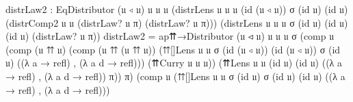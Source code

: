 \documentclass[
  11pt,
  oneside,
  article]{memoir}
\newenvironment{Shaded}{}{}
\newcommand{\NormalTok}[1]{#1}
\newcommand{\OtherTok}[1]{\textcolor[rgb]{0.00,0.44,0.13}{#1}}
\theoremstyle{definition}
\theoremstyle{plain}
\newcommand{\0}{\textsf{0}}
\newcommand{\1}{\tn{\textsf{1}}}
\begin{document}
\begin{Shaded}
\begin{Highlighting}[]
\NormalTok{    distrLaw2 }\OtherTok{:}\NormalTok{ EqDistributor }\OtherTok{(}\NormalTok{𝔲 ◃ 𝔲}\OtherTok{)}\NormalTok{ 𝔲 𝔲 𝔲}
                    \OtherTok{(}\NormalTok{distrLens 𝔲 𝔲 𝔲 }\OtherTok{(}\NormalTok{id }\OtherTok{(}\NormalTok{𝔲 ◃ 𝔲}\OtherTok{))}\NormalTok{ σ }\OtherTok{(}\NormalTok{id 𝔲}\OtherTok{)} \OtherTok{(}\NormalTok{id 𝔲}\OtherTok{)} 
                               \OtherTok{(}\NormalTok{distrComp2 𝔲 𝔲 }\OtherTok{(}\NormalTok{distrLaw? 𝔲 π}\OtherTok{)} 
                                               \OtherTok{(}\NormalTok{distrLaw? 𝔲 π}\OtherTok{)))} 
                    \OtherTok{(}\NormalTok{distrLens 𝔲 𝔲 𝔲 σ }\OtherTok{(}\NormalTok{id 𝔲}\OtherTok{)} \OtherTok{(}\NormalTok{id 𝔲}\OtherTok{)} \OtherTok{(}\NormalTok{id 𝔲}\OtherTok{)} 
                               \OtherTok{(}\NormalTok{distrLaw? 𝔲 π}\OtherTok{))}
\NormalTok{    distrLaw2 }\OtherTok{=} 
\NormalTok{        ap⇈→Distributor }\OtherTok{(}\NormalTok{𝔲 ◃ 𝔲}\OtherTok{)}\NormalTok{ 𝔲 𝔲 𝔲 σ}
            \OtherTok{(}\NormalTok{comp 𝔲 }
                \OtherTok{(}\NormalTok{comp }\OtherTok{(}\NormalTok{𝔲 ⇈ 𝔲}\OtherTok{)} 
                    \OtherTok{(}\NormalTok{comp }\OtherTok{(}\NormalTok{𝔲 ⇈ }\OtherTok{(}\NormalTok{𝔲 ⇈ 𝔲}\OtherTok{))} 
                        \OtherTok{(}\NormalTok{⇈[]Lens 𝔲 𝔲 σ }\OtherTok{(}\NormalTok{id }\OtherTok{(}\NormalTok{𝔲 ◃ 𝔲}\OtherTok{))} 
                            \OtherTok{(}\NormalTok{id }\OtherTok{(}\NormalTok{𝔲 ◃ 𝔲}\OtherTok{))}\NormalTok{ σ }\OtherTok{(}\NormalTok{id 𝔲}\OtherTok{)} 
                            \OtherTok{((λ}\NormalTok{ a }\OtherTok{→}\NormalTok{ refl}\OtherTok{)}\NormalTok{ , }\OtherTok{(λ}\NormalTok{ a d }\OtherTok{→}\NormalTok{ refl}\OtherTok{)))} 
                        \OtherTok{(}\NormalTok{⇈Curry 𝔲 𝔲 𝔲}\OtherTok{))} 
                    \OtherTok{(}\NormalTok{⇈Lens 𝔲 𝔲 }\OtherTok{(}\NormalTok{id 𝔲}\OtherTok{)} \OtherTok{(}\NormalTok{id 𝔲}\OtherTok{)} 
                           \OtherTok{((λ}\NormalTok{ a }\OtherTok{→}\NormalTok{ refl}\OtherTok{)}\NormalTok{ , }\OtherTok{(λ}\NormalTok{ a d }\OtherTok{→}\NormalTok{ refl}\OtherTok{))} 
\NormalTok{                           π}\OtherTok{))} 
\NormalTok{                π}\OtherTok{)}
            \OtherTok{(}\NormalTok{comp 𝔲 }\OtherTok{(}\NormalTok{⇈[]Lens 𝔲 𝔲 σ }\OtherTok{(}\NormalTok{id 𝔲}\OtherTok{)}\NormalTok{ σ }\OtherTok{(}\NormalTok{id 𝔲}\OtherTok{)} \OtherTok{(}\NormalTok{id 𝔲}\OtherTok{)} 
                             \OtherTok{((λ}\NormalTok{ a }\OtherTok{→}\NormalTok{ refl}\OtherTok{)}\NormalTok{ , }\OtherTok{(λ}\NormalTok{ a d }\OtherTok{→}\NormalTok{ refl}\OtherTok{)))} 

\end{Highlighting}
\end{Shaded}
\end{document}
